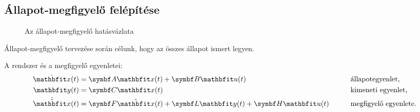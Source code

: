 \subsection{Állapot-megfigyelő felépítése}

\begin{figure}[htb]
  \centering
  
  \caption{Az állapot-megfigyelő hatásvázlata}
  \label{fig:state-observer}
\end{figure}

Állapot-megfigyelő tervezése során  célunk, hogy az összes állapot ismert
legyen.

A rendszer és a megfigyelő egyenletei:
\begin{alignat}{9}
  \dot{\rvec x}(t) & = \rmat A \rvec x(t) + \rmat B \rvec u(t)
                   &
                   & \text{állapotegyenlet,}
  \\
  \rvec y(t)       & = \rmat C \rvec x(t)
                   &
                   & \text{kimeneti egyenlet,}
  \\
  \dot{\hvec x}(t) & = \rmat F \hvec x(t) + \rmat L \rvec y(t) + \rmat H \rvec u(t) \quad \quad
                   &
                   & \text{megfigyelő egyenlete.}
\end{alignat}

